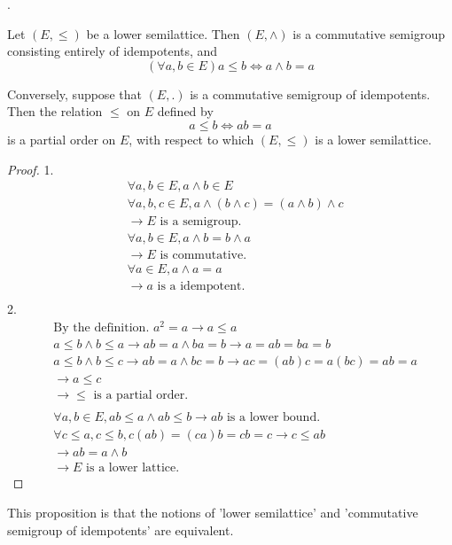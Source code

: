 \begin{Prop}.

    Let $(E,\leq)$ be a lower semilattice. Then $(E,\wedge)$ is a commutative semigroup consisting entirely of idempotents, and 
    $$(\forall a,b\in E)a\leq b \Leftrightarrow a\wedge b=a$$

    Conversely, suppose that $(E,.)$ is a commutative semigroup of idempotents. Then the relation $\leq$ on $E$ defined by
    $$a\leq b \Leftrightarrow ab = a$$
    is a partial order on $E$, with respect to which $(E,\leq)$ is a lower semilattice.
    
    \begin{proof}
        1.
        \begin{align*}
            &\forall a,b \in E, a\wedge b \in E    \\
            &\forall a,b,c\in E, a\wedge(b\wedge c)=(a\wedge b)\wedge c  \\
            &\rightarrow E \text{ is a semigroup.}  \\
            &\forall a,b \in E, a\wedge b=b\wedge a \\
            &\rightarrow E \text{ is commutative.}  \\
            &\forall a \in E, a\wedge a=a   \\
            &\rightarrow a \text{ is a idempotent.}  \\
        \end{align*}
        2.
        \begin{align*}
            &\text{By the definition. } a^2=a \rightarrow a \leq a  \\
            & a\leq b \wedge b\leq a \rightarrow ab = a\wedge ba =b\rightarrow a=ab=ba=b    \\
            & a\leq b \wedge b\leq c \rightarrow ab=a\wedge bc =b \rightarrow ac =(ab)c=a(bc)=ab=a  \\
            &\rightarrow a \leq c   \\
            &\rightarrow \leq \text{ is a partial order.}\\
            & \\
            &\forall a,b \in E, ab \leq a \wedge ab \leq b \rightarrow ab\text{ is a lower bound.}  \\
            &\forall c\leq a,c\leq b, c(ab)=(ca)b=cb=c \rightarrow c \leq ab    \\
            &\rightarrow ab=a\wedge b   \\
            &\rightarrow E \text{ is a lower lattice.}
        \end{align*}
    \end{proof}
    This proposition is that the notions of 'lower semilattice' and 'commutative semigroup of idempotents' are equivalent.
\end{Prop}

